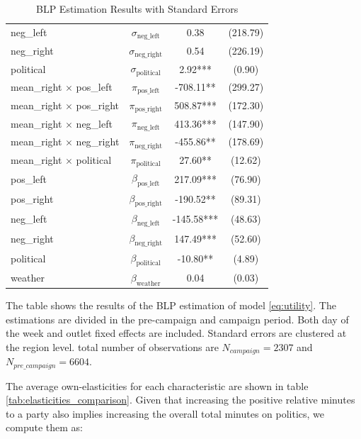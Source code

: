 \documentclass[12pt]{article}
\begin{document}
\begin{table}[ht]
\begin{threeparttable}
\begin{tabular}{lccc}
				neg\_left & $ \sigma_{\text{neg\_left}} $ & 0.38 & (218.79) \\
				neg\_right & $ \sigma_{\text{neg\_right}} $ & 0.54 & (226.19) \\
				political & $ \sigma_{\text{political}} $ & 2.92***& (0.90) \\
				\hline
				mean\_right $\times$ pos\_left & $ \pi_{\text{pos\_left}} $ & -708.11** & (299.27) \\
				mean\_right $\times$ pos\_right & $ \pi_{\text{pos\_right}} $ & 508.87*** & (172.30) \\
				mean\_right $\times$ neg\_left & $ \pi_{\text{neg\_left}} $ & 413.36*** & (147.90) \\
				mean\_right $\times$ neg\_right & $ \pi_{\text{neg\_right}} $ & -455.86** & (178.69) \\
				mean\_right $\times$ political & $ \pi_{\text{political}} $ & 27.60** & (12.62) \\
				\hline
				pos\_left & $ \beta_{\text{pos\_left}} $ & 217.09*** & (76.90) \\
				pos\_right & $ \beta_{\text{pos\_right}} $ & -190.52** & (89.31) \\
				neg\_left & $ \beta_{\text{neg\_left}} $ & -145.58*** & (48.63) \\
				neg\_right & $ \beta_{\text{neg\_right}} $ & 147.49*** & (52.60) \\
				political & $ \beta_{\text{political}} $ & -10.80** & (4.89) \\
				weather & $ \beta_{\text{weather}} $ & 0.04 & (0.03) \\
				\hline
				\hline
			\end{tabular}
			\caption{BLP Estimation Results with Standard Errors \label{table:results_blp_updated}}
			\begin{tablenotes}
				\small
				\item The table shows the results of the BLP estimation of model \ref{eq:utility}. The estimations are divided in the pre-campaign and campaign period. Both day of the week and outlet fixed effects are included. Standard errors are clustered at the region level. total number of observations are $N_{campaign}=2307$ and  $N_{pre\_campaign}=6604$.
			\end{tablenotes}
		\end{threeparttable}
	\end{table}
	
	
	
	
	
	
	The average own-elasticities for each characteristic are shown in table \ref{tab:elasticities_comparison}. Given that increasing the positive relative minutes to a party also implies increasing the overall total minutes on politics, we compute them as:
	
\end{document}
